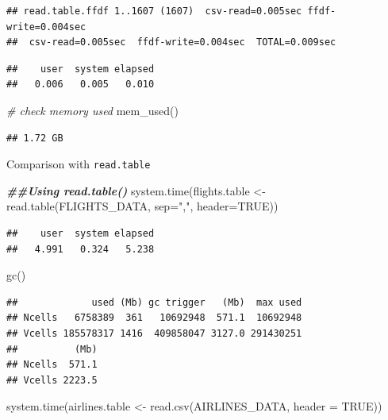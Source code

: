 \documentclass[
  12pt,
]{style/krantz}
\newenvironment{Shaded}{\begin{snugshade}}{\end{snugshade}}
\newcommand{\AttributeTok}[1]{\textcolor[rgb]{0.77,0.63,0.00}{#1}}
\newcommand{\CommentTok}[1]{\textcolor[rgb]{0.56,0.35,0.01}{\textit{#1}}}
\newcommand{\ConstantTok}[1]{\textcolor[rgb]{0.00,0.00,0.00}{#1}}
\newcommand{\DocumentationTok}[1]{\textcolor[rgb]{0.56,0.35,0.01}{\textbf{\textit{#1}}}}
\newcommand{\FunctionTok}[1]{\textcolor[rgb]{0.00,0.00,0.00}{#1}}
\newcommand{\NormalTok}[1]{#1}
\newcommand{\OtherTok}[1]{\textcolor[rgb]{0.56,0.35,0.01}{#1}}
\newcommand{\StringTok}[1]{\textcolor[rgb]{0.31,0.60,0.02}{#1}}
\begin{document}
\begin{verbatim}
## read.table.ffdf 1..1607 (1607)  csv-read=0.005sec ffdf-write=0.004sec
##  csv-read=0.005sec  ffdf-write=0.004sec  TOTAL=0.009sec
\end{verbatim}

\begin{verbatim}
##    user  system elapsed 
##   0.006   0.005   0.010
\end{verbatim}

\begin{Shaded}
\begin{Highlighting}[]
\CommentTok{\# check memory used}
\FunctionTok{mem\_used}\NormalTok{()}
\end{Highlighting}
\end{Shaded}

\begin{verbatim}
## 1.72 GB
\end{verbatim}

Comparison with \texttt{read.table}

\begin{Shaded}
\begin{Highlighting}[]
\DocumentationTok{\#\#Using read.table()}
\FunctionTok{system.time}\NormalTok{(flights.table }\OtherTok{\textless{}{-}} \FunctionTok{read.table}\NormalTok{(FLIGHTS\_DATA, }
                                        \AttributeTok{sep=}\StringTok{","}\NormalTok{,}
                                        \AttributeTok{header=}\ConstantTok{TRUE}\NormalTok{))}
\end{Highlighting}
\end{Shaded}

\begin{verbatim}
##    user  system elapsed 
##   4.991   0.324   5.238
\end{verbatim}

\begin{Shaded}
\begin{Highlighting}[]
\FunctionTok{gc}\NormalTok{()}
\end{Highlighting}
\end{Shaded}

\begin{verbatim}
##             used (Mb) gc trigger   (Mb)  max used
## Ncells   6758389  361   10692948  571.1  10692948
## Vcells 185578317 1416  409858047 3127.0 291430251
##          (Mb)
## Ncells  571.1
## Vcells 2223.5
\end{verbatim}

\begin{Shaded}
\begin{Highlighting}[]
\FunctionTok{system.time}\NormalTok{(airlines.table }\OtherTok{\textless{}{-}} \FunctionTok{read.csv}\NormalTok{(AIRLINES\_DATA,}
                                       \AttributeTok{header =} \ConstantTok{TRUE}\NormalTok{))}
\end{Highlighting}
\end{Shaded}
\end{document}
